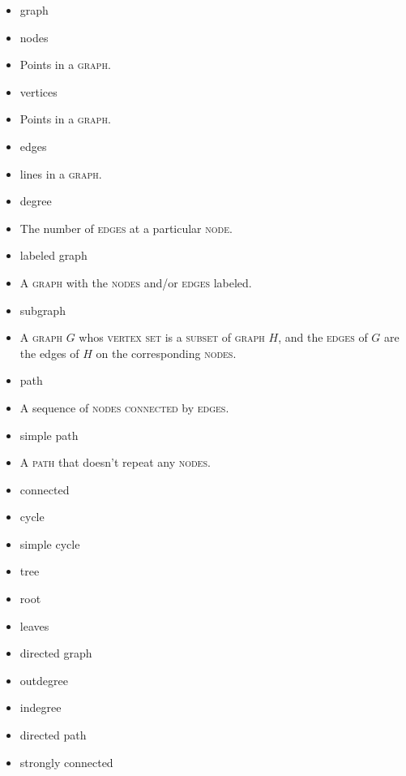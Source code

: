 \documentclass{article}
\newcommand{\term}[1]{\textsc{#1}}
\begin{document}
\bigskip \indent
\begin{itemize}
\item graph

\item nodes
 \item Points in a \term{graph}.
\item vertices
 \item Points in a \term{graph}.
\item edges
 \item lines in a \term{graph}.
\item degree
 \item The number of \term{edges} at a particular \term{node}.
\item labeled graph
 \item A \term{graph} with the \term{nodes} and/or \term{edges} labeled.
\item subgraph
 \item A \term{graph} $G$ whos \term{vertex} \term{set} is a \term{subset} of \term{graph} $H$, and the \term{edges} of $G$ are the edges of $H$ on the corresponding \term{nodes}.
\item path
 \item A sequence of \term{nodes} \term{connected} by \term{edges}.
\item simple path
 \item A \term{path} that doesn't repeat any \term{nodes}.
\item connected

\item cycle

\item simple cycle
\item tree

\item root

\item leaves

\item directed graph

\item outdegree

\item indegree

\item directed path

\item strongly connected

\end{itemize}
   
\end{document}

